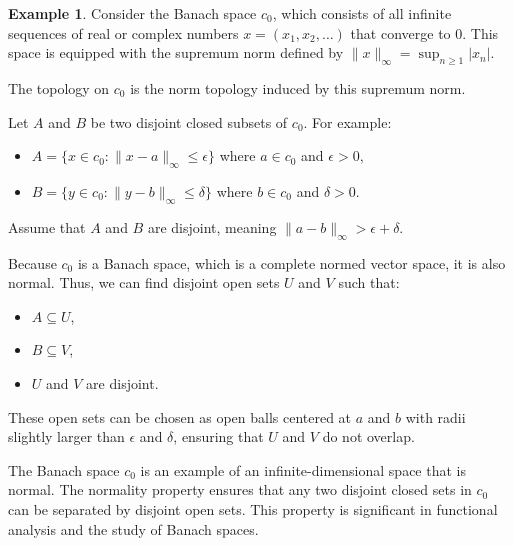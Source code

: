 \documentclass[12pt, reqno]{amsart}
\theoremstyle{definition}
\newtheorem{example}[theorem]{Example}
\numberwithin{equation}{section}
\newcommand{\dR}{{\mathbb R}}
\begin{document}
\begin{comment}
\begin{example}
    Consider $\dR^n$ with the usual topology. \\
    Let $A$ and $B$ be two disjoint closed sets. \\
    Note that if $A$ and $B$ are two disjoint closed disks, you can always find two disjoint open disks such that one contains $A$ and the other contains $B$. This separation property verifies that $\dR^n$ is normal.
\end{example}    
\end{comment}

\begin{example}
Consider the Banach space $c_0$, which consists of all infinite sequences of real or complex numbers $x = (x_1, x_2, \dots)$ that converge to 0. This space is equipped with the supremum norm defined by
$\|x\|_{\infty} = \sup_{n \geq 1} |x_n|.$

The topology on $c_0$ is the norm topology induced by this supremum norm.

Let $A$ and $B$ be two disjoint closed subsets of $c_0$. For example:
\begin{itemize}
    \item $A = \{ x \in c_0 : \|x - a\|_{\infty} \leq \epsilon \}$ where $a \in c_0$ and $\epsilon > 0$,
    \item $B = \{ y \in c_0 : \|y - b\|_{\infty} \leq \delta \}$ where $b \in c_0$ and $\delta > 0$.
\end{itemize}
Assume that $A$ and $B$ are disjoint, meaning $\|a - b\|_{\infty} > \epsilon + \delta$.

Because $c_0$ is a Banach space, which is a complete normed vector space, it is also normal. Thus, we can find disjoint open sets $U$ and $V$ such that:
\begin{itemize}
    \item $A \subseteq U$,
    \item $B \subseteq V$,
    \item $U$ and $V$ are disjoint.
\end{itemize}

These open sets can be chosen as open balls centered at $a$ and $b$ with radii slightly larger than $\epsilon$ and $\delta$, ensuring that $U$ and $V$ do not overlap.
\end{example}
The Banach space $c_0$ is an example of an infinite-dimensional space that is normal. The normality property ensures that any two disjoint closed sets in $c_0$ can be separated by disjoint open sets. This property is significant in functional analysis and the study of Banach spaces.
\end{document}
